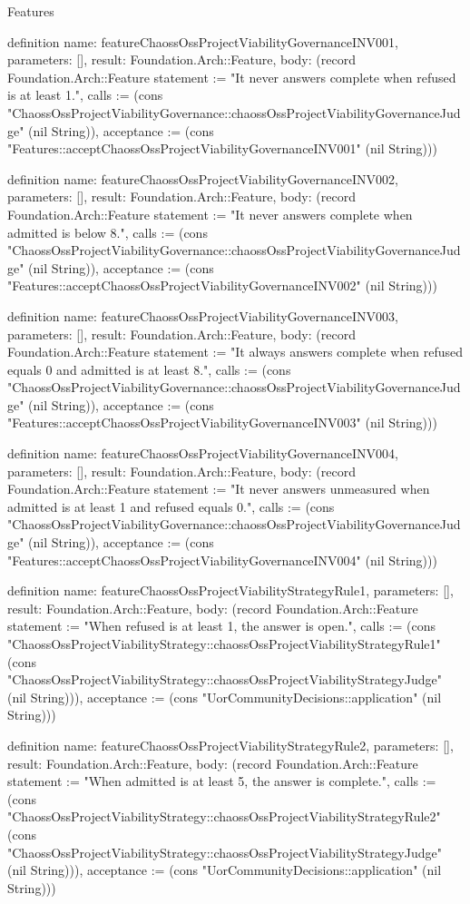 \begin{lexlean}{Features}
\begin{semanticmodule}
definition{
  name: featureChaossOssProjectViabilityGovernanceINV001,
  parameters: [],
  result: Foundation.Arch::Feature,
  body: (record Foundation.Arch::Feature {statement := "It never answers complete when refused is at least 1.", calls := (cons "ChaossOssProjectViabilityGovernance::chaossOssProjectViabilityGovernanceJudge" (nil String)), acceptance := (cons "Features::acceptChaossOssProjectViabilityGovernanceINV001" (nil String))})
}

definition{
  name: featureChaossOssProjectViabilityGovernanceINV002,
  parameters: [],
  result: Foundation.Arch::Feature,
  body: (record Foundation.Arch::Feature {statement := "It never answers complete when admitted is below 8.", calls := (cons "ChaossOssProjectViabilityGovernance::chaossOssProjectViabilityGovernanceJudge" (nil String)), acceptance := (cons "Features::acceptChaossOssProjectViabilityGovernanceINV002" (nil String))})
}

definition{
  name: featureChaossOssProjectViabilityGovernanceINV003,
  parameters: [],
  result: Foundation.Arch::Feature,
  body: (record Foundation.Arch::Feature {statement := "It always answers complete when refused equals 0 and admitted is at least 8.", calls := (cons "ChaossOssProjectViabilityGovernance::chaossOssProjectViabilityGovernanceJudge" (nil String)), acceptance := (cons "Features::acceptChaossOssProjectViabilityGovernanceINV003" (nil String))})
}

definition{
  name: featureChaossOssProjectViabilityGovernanceINV004,
  parameters: [],
  result: Foundation.Arch::Feature,
  body: (record Foundation.Arch::Feature {statement := "It never answers unmeasured when admitted is at least 1 and refused equals 0.", calls := (cons "ChaossOssProjectViabilityGovernance::chaossOssProjectViabilityGovernanceJudge" (nil String)), acceptance := (cons "Features::acceptChaossOssProjectViabilityGovernanceINV004" (nil String))})
}

definition{
  name: featureChaossOssProjectViabilityStrategyRule1,
  parameters: [],
  result: Foundation.Arch::Feature,
  body: (record Foundation.Arch::Feature {statement := "When refused is at least 1, the answer is open.", calls := (cons "ChaossOssProjectViabilityStrategy::chaossOssProjectViabilityStrategyRule1" (cons "ChaossOssProjectViabilityStrategy::chaossOssProjectViabilityStrategyJudge" (nil String))), acceptance := (cons "UorCommunityDecisions::application" (nil String))})
}

definition{
  name: featureChaossOssProjectViabilityStrategyRule2,
  parameters: [],
  result: Foundation.Arch::Feature,
  body: (record Foundation.Arch::Feature {statement := "When admitted is at least 5, the answer is complete.", calls := (cons "ChaossOssProjectViabilityStrategy::chaossOssProjectViabilityStrategyRule2" (cons "ChaossOssProjectViabilityStrategy::chaossOssProjectViabilityStrategyJudge" (nil String))), acceptance := (cons "UorCommunityDecisions::application" (nil String))})
}


\end{semanticmodule}
\end{lexlean}
